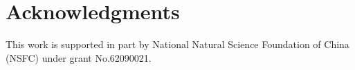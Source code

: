 \documentclass[sigconf]{acmart}
\begin{document}







\section{Acknowledgments}
This work is supported in part by National Natural Science Foundation of China (NSFC) under grant No.62090021.


% 

\end{document}
